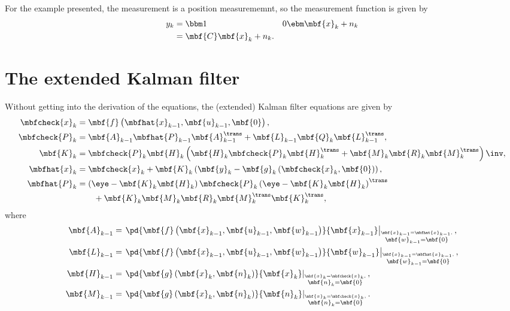 \documentclass[nobib]{tufte-handout}
\begin{document}
    For the example presented, the measurement is a position measurememnt, so the measurement function is given by
    \begin{align}
        y_{k} &= \bbm 1 & 0 \ebm\mbf{x}_{k} + n_{k}\\
        &= \mbf{C}\mbf{x}_{k} + n_{k}.
    \end{align}


    \section{The extended Kalman filter}
    Without getting into the derivation of the equations, the (extended) Kalman filter equations are given by \cite[eq.~(4.32)]{Barfoot_State_2017a}
    \begin{subequations}    
        \label{eq:EKF eqns}
        \begin{align}
            \label{eq:EKF: prediction}
            \mbfcheck{x}_{k} &= \mbf{f}\left( \mbfhat{x}_{k-1}, \mbf{u}_{k-1}, \mbf{0} \right), \\
            \label{eq:EKF: prediction cov}
            \mbfcheck{P}_{k} &= \mbf{A}_{k-1}\mbfhat{P}_{k-1}\mbf{A}_{k-1}^{\trans} + \mbf{L}_{k-1}\mbf{Q}_{k}\mbf{L}_{k-1}^{\trans},\\
            \label{eq:EKF: KF gain}
            \mbf{K}_{k} &= \mbfcheck{P}_{k}\mbf{H}_{k}\left( \mbf{H}_{k}\mbfcheck{P}_{k}\mbf{H}_{k}^{\trans} + \mbf{M}_{k}\mbf{R}_{k}\mbf{M}_{k}^{\trans} \right)\inv,\\
            \label{eq:EKF: correction}
            \mbfhat{x}_{k} &= \mbfcheck{x}_{k} + \mbf{K}_{k}\left( \mbf{y}_{k} - \mbf{g}_{k}\left( \mbfcheck{x}_{k}, \mbf{0} \right) \right),\\
            \label{eq:EKF: correction cov}
            \mbfhat{P}_{k} &= \left( \eye - \mbf{K}_{k}\mbf{H}_{k} \right)\mbfcheck{P}_{k}\left( \eye - \mbf{K}_{k}\mbf{H}_{k} \right)^{\trans} \nonumber\\&\qquad+ \mbf{K}_{k}\mbf{M}_{k}\mbf{R}_{k}\mbf{M}_{k}^{\trans}\mbf{K}_{k}^{\trans},
        \end{align}
    \end{subequations}
    where 
    \begin{align}
        \mbf{A}_{k-1} &= \left.\pd{\mbf{f}\left( \mbf{x}_{k-1}, \mbf{u}_{k-1}, \mbf{w}_{k-1} \right)}{\mbf{x}_{k-1}}\right|_{\overset{\mbf{x}_{k-1}=\mbfhat{x}_{k-1},}{\mbf{w}_{k-1}=\mbf{0}}},\\
        \mbf{L}_{k-1} &= \left.\pd{\mbf{f}\left( \mbf{x}_{k-1}, \mbf{u}_{k-1}, \mbf{w}_{k-1} \right)}{\mbf{w}_{k-1}}\right|_{\overset{\mbf{x}_{k-1}=\mbfhat{x}_{k-1},}{\mbf{w}_{k-1}=\mbf{0}}},\\
        \mbf{H}_{k-1} &= \left.\pd{\mbf{g}\left( \mbf{x}_{k}, \mbf{n}_{k} \right)}{\mbf{x}_{k}}\right|_{\overset{\mbf{x}_{k}=\mbfcheck{x}_{k},}{\mbf{n}_{k}=\mbf{0}}},\\
        \mbf{M}_{k-1} &= \left.\pd{\mbf{g}\left( \mbf{x}_{k}, \mbf{n}_{k} \right)}{\mbf{n}_{k}}\right|_{\overset{\mbf{x}_{k}=\mbfcheck{x}_{k},}{\mbf{n}_{k}=\mbf{0}}}.
    \end{align}
\end{document}
